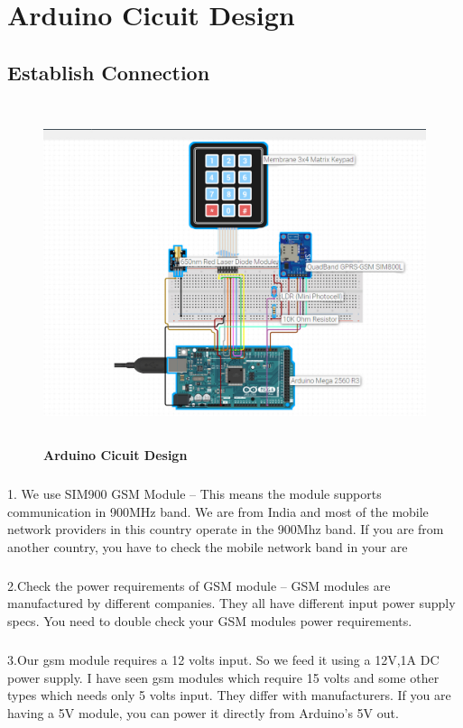 
\chapter{Arduino Cicuit Design}
\section{Establish Connection}
\begin{figure}[H]
 \centering
    \includegraphics[height= 10cm, width=13cm]{project/images/circuit diagram}
  \caption{\textbf{Arduino Cicuit Design}}
\end{figure}
\paragraph{}1. We use SIM900 GSM Module – This means the module supports communication in 900MHz band. We are from India and most of the mobile network providers in this country operate in the 900Mhz band. If you are from another country, you have to check the mobile network band in your are
\paragraph{}2.Check the power requirements of GSM module – GSM modules are manufactured by different companies. They all have different input power supply specs. You need to double check your GSM modules power requirements.
\paragraph{}3.Our gsm module requires a 12 volts input. So we feed it using a 12V,1A DC power supply. I have seen gsm modules which require 15 volts and some other types which needs only 5 volts input. They differ with manufacturers. If you are having a 5V module, you can power it directly from Arduino’s 5V out.
